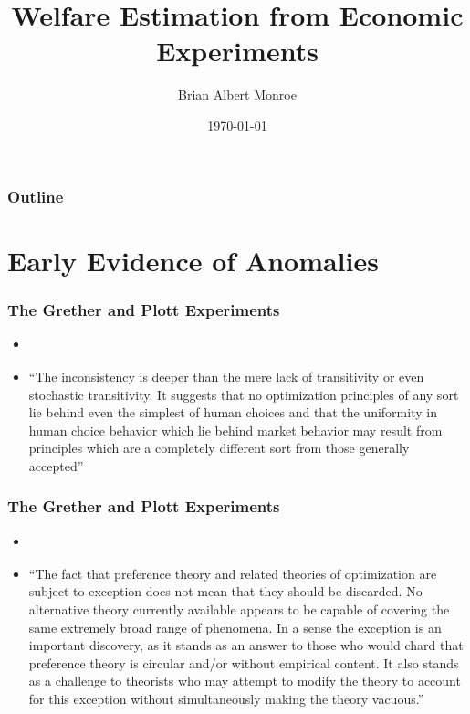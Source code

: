 \documentclass{beamer}
\title{Welfare Estimation from Economic Experiments}
\author{Brian Albert Monroe}
\date{\today}
\begin{document}
\begin{frame}
	\titlepage
\end{frame}

\begin{frame}
\frametitle{Outline}
\tableofcontents
\end{frame}

\section{Early Evidence of Anomalies}

\begin{frame}
\frametitle{The Grether and Plott Experiments}
\begin{itemize}
	\item \textcite[624]{Grether1979}
	\item \enquote{The inconsistency is deeper than the mere lack of transitivity or even stochastic transitivity. It suggests that no optimization principles of any sort lie behind even the simplest of human choices and that the uniformity in human choice behavior which lie behind market behavior may result from principles which are a completely different sort from those generally accepted}
\end{itemize}
\end{frame}

\begin{frame}
\frametitle{The Grether and Plott Experiments}
\begin{itemize}
	\item \textcite[634]{Grether1979}
	\item \enquote{The fact that preference theory and related theories of optimization are subject to exception does not mean that they should be discarded. No alternative theory currently available appears to be capable of covering the same extremely broad range of phenomena. In a sense the exception is an important discovery, as it stands as an answer to those who would chard that preference theory is circular and/or without empirical content. It also stands as a challenge to theorists who may attempt to modify the theory to account for this exception without simultaneously making the theory vacuous.}
\end{itemize}
\end{frame}
\end{document}
